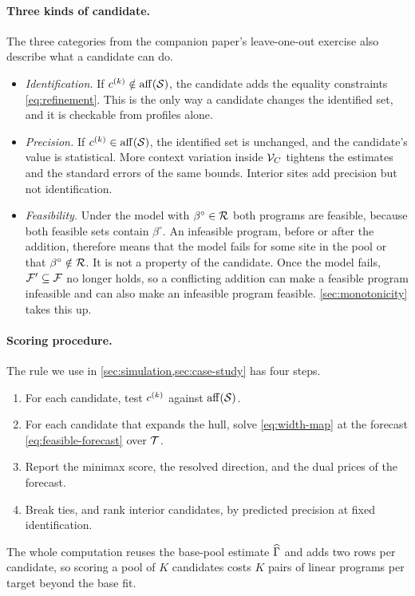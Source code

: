 \paragraph{Three kinds of candidate.}
The three categories from the companion paper's leave-one-out exercise
also describe what a candidate can do.
\begin{itemize}
\item \emph{Identification.} If $c^{(k)}\notin\operatorname{aff}(\mathcal S)$, the
  candidate adds the equality constraints \eqref{eq:refinement}. This is
  the only way a candidate changes the identified set, and it is
  checkable from profiles alone.
\item \emph{Precision.} If $c^{(k)}\in\operatorname{aff}(\mathcal S)$, the identified
  set is unchanged, and the candidate's value is statistical. More context
variation inside $\mathcal V_C$ tightens the estimates and the standard errors
of the same bounds. Interior sites add precision but not identification.
\item \emph{Feasibility.} Under the model with $\beta^\circ\in\mathcal R$
  both programs are feasible, because both feasible sets contain
  $\beta^\circ$. An infeasible program, before or after the addition,
  therefore means that the model fails for some site in the pool or that
  $\beta^\circ\notin\mathcal R$. It is not a property of the candidate.
  Once the model fails, $\mathcal F'\subseteq\mathcal F$ no longer holds, so
  a conflicting addition can make a feasible program infeasible and can
  also make an infeasible program feasible.
  \cref{sec:monotonicity} takes this up.
\end{itemize}

\paragraph{Scoring procedure.}
The rule we use in \cref{sec:simulation,sec:case-study} has four steps.
\begin{enumerate}
\item For each candidate, test $c^{(k)}$ against $\operatorname{aff}(\mathcal S)$.
\item For each candidate that expands the hull, solve \eqref{eq:width-map}
  at the forecast \eqref{eq:feasible-forecast} over $\mathcal T$.
\item Report the minimax score, the resolved direction, and the dual
  prices of the forecast.
\item Break ties, and rank interior candidates, by predicted precision
  at fixed identification.
\end{enumerate}
The whole computation reuses the base-pool estimate $\widehat{\Gamma}$ and adds two rows per
candidate, so scoring a pool of $K$ candidates costs $K$ pairs of linear
programs per target beyond the base fit.
